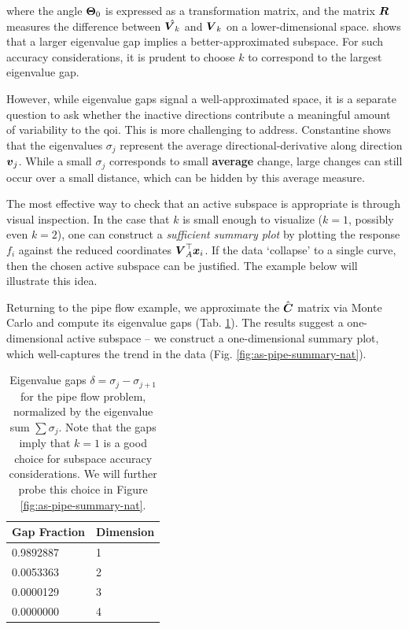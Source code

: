 \documentclass{article}
\begin{document}
\noindent where the angle $\boldsymbol{\Theta}_0$ is expressed as a transformation matrix,
and the matrix $\boldsymbol{R}$ measures the difference between $\hat{\boldsymbol{V}_k}$ and $\boldsymbol{V}_k$
on a lower-dimensional space.  shows that a larger
eigenvalue gap implies a better-approximated subspace. For such accuracy
considerations, it is prudent to choose $k$ to correspond to the largest
eigenvalue gap.

However, while eigenvalue gaps signal a well-approximated space, it is a
separate question to ask whether the inactive directions contribute a meaningful
amount of variability to the qoi. This is more challenging to address.
Constantine\cite{constantine2015} shows that the eigenvalues $\sigma_j$
represent the average directional-derivative along direction $\boldsymbol{v}_j$. While a
small $\sigma_j$ corresponds to small \textbf{average} change, large changes can
still occur over a small distance, which can be hidden by this average measure.

The most effective way to check that an active subspace is appropriate is
through visual inspection. In the case that $k$ is small enough to visualize
($k=1$, possibly even $k=2$), one can construct a \emph{sufficient summary
  plot}\cite{cook2009regression} by plotting the response $f_i$ against the
reduced coordinates $\boldsymbol{V}_{A}^{\top}\boldsymbol{x}_i$. If the data `collapse' to a single
curve, then the chosen active subspace can be justified. The example below will
illustrate this idea.

Returning to the pipe flow example, we approximate the $\hat{\boldsymbol{C}}$ matrix via
Monte Carlo and compute its eigenvalue gaps (Tab. \ref{tab:as-pipe-gaps}). The
results suggest a one-dimensional active subspace -- we construct a
one-dimensional summary plot, which well-captures the trend in the data (Fig.
\ref{fig:as-pipe-summary-nat}).

\begin{table}[!ht]
  \centering
  \begin{tabular}{@{}ll@{}}
    \hline
    Gap Fraction & Dimension\\
    \hline
    0.9892887 & 1\\
    \hline
    0.0053363 & 2\\
    \hline
    0.0000129 & 3\\
    \hline
    0.0000000 & 4\\
    \hline
  \end{tabular}
  \caption{Eigenvalue gaps $\delta = \sigma_j - \sigma_{j+1}$ for the pipe flow
    problem, normalized by the eigenvalue sum $\sum \sigma_j$. Note that the
    gaps imply that $k=1$ is a good choice for subspace accuracy considerations.
    We will further probe this choice in Figure \ref{fig:as-pipe-summary-nat}.}
  \label{tab:as-pipe-gaps}
\end{table}
\end{document}
